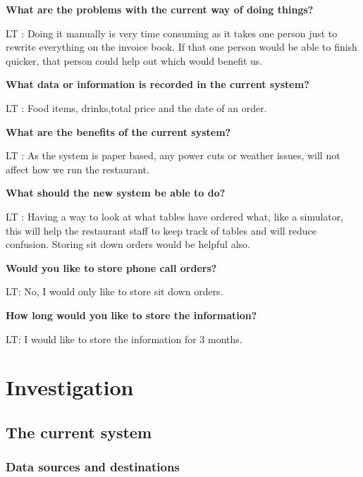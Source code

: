 \textbf{What are the problems with the current way of doing things?}

LT : Doing it manually is very time consuming as it takes one person just to rewrite everything on the invoice book. If that one person would be able to finish quicker, that person could help out which would benefit us. 

\textbf{What data or information is recorded in the current system?}

LT : Food items, drinks,total price and the date of an order.

\textbf{What are the benefits of the current system?}

LT : As the system is paper based, any power cuts or weather issues, will not affect how we run the restaurant.

\textbf{What should the new system be able to do?}

LT : Having a way to look at what tables have ordered what, like a simulator, this will help the restaurant staff to keep track of tables and will reduce confusion. Storing sit down orders would be helpful also.

\textbf{Would you like to store phone call orders?}

LT: No, I would only like to store sit down orders.

\textbf{How long would you like to store the information?}

LT: I would like to store the information for 3 months.


\section{Investigation}

\subsection{The current system}

\subsubsection{Data sources and destinations}

